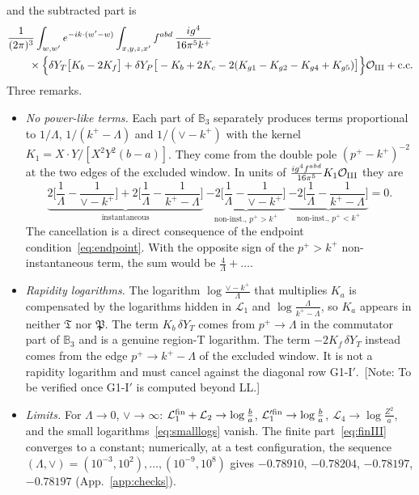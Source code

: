 \documentclass[aps,prd,onecolumn,superscriptaddress,nofootinbib,floatfix,longbibliography,11pt]{revtex4-2}
\numberwithin{equation}{section}
\newif\ifshownotes \shownotestrue
\newcommand{\note}[1]{\ifshownotes{\color{red}\,[\textsf{Note:} #1]}\fi}
\def\mf#1{\mathbb{#1}}
\newcommand{\Lo}{\mathcal{L}_{1}}
\newcommand{\Lop}{\mathcal{L}_{1}'}
\newcommand{\Lt}{\mathcal{L}_{2}}
\newcommand{\Lf}{\mathcal{L}_{4}}
\newcommand{\pre}{\frac{1}{(2\pi)^3}\int_{w,w'}e^{-ik\cdot(w'-w)}}
\newcommand{\Ord}{\mathcal{O}}
\begin{document}
and the subtracted part is
\begin{align}
&\pre\int_{x,y,z,x'}f^{abd}\,\frac{ig^4}{16\pi^5k^+}\notag\\
&\qquad\times\Big\{\delta Y_T\big[K_b-2K_f\big]+\delta Y_P\big[-K_b+2K_c-2(K_{g1}-K_{g2}-K_{g4}+K_{g5})\big]\Big\}\Ord_{\rm III}+{\rm c.c.}
\label{eq:LLIII}
\end{align}
Three remarks.
\begin{itemize}
\item \emph{No power-like terms.} Each part of $\mf B_3$ separately produces terms proportional to $1/\Lambda$, $1/(k^+-\Lambda)$ and $1/(\vee-k^+)$ with the kernel $K_1=X\cdot Y/[X^2Y^2(b-a)]$. They come from the double pole $(p^+-k^+)^{-2}$ at the two edges of the excluded window. In units of $\frac{ig^4f^{abd}}{16\pi^5}K_1\Ord_{\rm III}$ they are
\begin{equation}
\underbrace{2\Big[\frac1\Lambda-\frac{1}{\vee-k^+}\Big]+2\Big[\frac1\Lambda-\frac{1}{k^+-\Lambda}\Big]}_{\text{instantaneous}}\ \underbrace{-2\Big[\frac1\Lambda-\frac{1}{\vee-k^+}\Big]}_{\text{non-inst., }p^+>k^+}\ \underbrace{-2\Big[\frac1\Lambda-\frac{1}{k^+-\Lambda}\Big]}_{\text{non-inst., }p^+<k^+}=0 .
\label{eq:powercancel}
\end{equation}
The cancellation is a direct consequence of the endpoint condition~\eqref{eq:endpoint}. With the opposite sign of the $p^+>k^+$ non-instantaneous term, the sum would be $\frac{4}{\Lambda}+\dots$.
\item \emph{Rapidity logarithms.} The logarithm $\log\frac{\vee-k^+}{\Lambda}$ that multiplies $K_a$ is compensated by the logarithms hidden in $\Lo$ and $\log\frac{\Lambda}{k^+-\Lambda}$, so $K_a$ appears in neither $\mathfrak T$ nor $\mathfrak P$. The term $K_b\,\delta Y_T$ comes from $p^+\to\Lambda$ in the commutator part of $\mf B_3$ and is a genuine region-T logarithm. The term $-2K_f\,\delta Y_T$ instead comes from the edge $p^+\to k^+-\Lambda$ of the excluded window. It is not a rapidity logarithm and must cancel against the diagonal row G1-I$'$.
\note{To be verified once G1-I$'$ is computed beyond LL.}
\item \emph{Limits.} For $\Lambda\to0$, $\vee\to\infty$: $\Lo^{\rm fin}+\Lt\to\log\frac{b}{a}$, $\Lop^{\rm fin}\to\log\frac ba$, $\Lf\to\log\frac{Z^2}{a}$, and the small logarithms~\eqref{eq:smalllogs} vanish. The finite part~\eqref{eq:finIII} converges to a constant; numerically, at a test configuration, the sequence $(\Lambda,\vee)=(10^{-3},10^2),\dots,(10^{-9},10^8)$ gives $-0.78910$, $-0.78204$, $-0.78197$, $-0.78197$ (App.~\ref{app:checks}).
\end{itemize}
\end{document}
